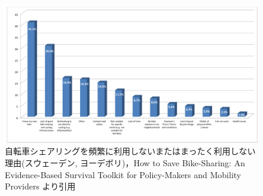           \begin{figure}[htbp]
            \centering
            \includegraphics[scale=0.53]
            {figures/reasonsForNotUsingBikeSharing.png}
            \caption{自転車シェアリングを頻繁に利用しないまたはまったく利用しない理由(スウェーデン, ヨーデボリ)，How to Save Bike-Sharing: An Evidence-Based Survival Toolkit for Policy-Makers and Mobility Providers より引用}
            \label{fig:自転車シェアリングを頻繁に利用しないまたはまったく利用しない理由}
          \end{figure}

